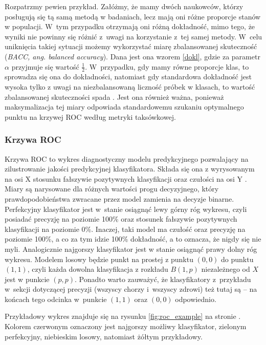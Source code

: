 \documentclass[inzynierska]{pwr_wmat_praca_dyplomowa}
\theoremstyle{plain}
\numberwithin{theorem}{chapter}
\theoremstyle{definition}
\numberwithin{theorem}{chapter}
\begin{document}
Rozpatrzmy pewien przykład. Załóżmy, że mamy dwóch naukowców, którzy posługują się tą samą metodą w badaniach, lecz mają oni różne proporcje stanów w populacji. W~tym przypadku otrzymają oni różną dokładność, mimo tego, że wyniki nie powinny się różnić z~uwagi na korzystanie z~tej samej metody. W~celu uniknięcia takiej sytuacji możemy wykorzystać miarę zbalansowanej skuteczność (\textit{BACC, ang. balanced accuracy}). Dana jest ona wzorem \ref{dokl}, gdzie za parametr $\alpha$ przyjmuje się wartość $\frac{1}{2}$. W~przypadku, gdy mamy równe proporcje klas, to sprowadza się ona do dokładności, natomiast gdy standardowa dokładność jest wysoka tylko z uwagi na niezbalansowaną liczność próbek w klasach, to wartość zbalansowanej skuteczności spada \cite{balanced_accuracy}. Jest ona również ważna, ponieważ maksymalizacja tej miary odpowiada standardowemu szukaniu optymalnego punktu na krzywej ROC według metryki taksówkowej.

\subsubsection{Krzywa ROC}

Krzywa ROC to wykres diagnostyczny modelu predykcyjnego pozwalający na zilustrowanie jakości predykcyjnej klasyfikatora. Składa się ona z wyrysowanym na osi X stosunku fałszywie pozytywnych klasyfikacji oraz czułości na osi Y \cite{evaluation_metrics}. Miary są narysowane dla różnych wartości progu decyzyjnego, który prawdopodobieństwa zwracane przez model zamienia na decyzje binarne. Perfekcyjny klasyfikator jest w~stanie osiągnąć lewy górny róg wykresu, czyli posiadać precyzję na poziomie 100\% oraz stosunek fałszywie pozytywnych klasyfikacji na poziomie 0\%. Inaczej, taki model ma czułość oraz precyzję na poziomie 100\%, a co za tym idzie 100\% dokładność, a to oznacza, że nigdy się nie myli.  Analogicznie najgorszy klasyfikator jest w stanie osiągnąć prawy dolny róg wykresu. Modelem losowy będzie punkt na prostej z punktu $(0,0)$ do punktu $(1,1)$, czyli każda dowolna klasyfikacja z rozkładu $B(1, p)$ niezależnego od $X$ jest w punkcie $(p, p)$. Ponadto warto zauważyć, że klasyfikatory z~przykładu w~sekcji dotyczącej precyzji (wszyscy chorzy i~wszyscy zdrowi) też tutaj są -- na końcach tego odcinka w~punkcie $(1, 1)$ oraz $(0, 0)$ odpowiednio.

Przykładowy wykres znajduje się na rysunku \ref{fig:roc_example} na stronie \pageref{fig:roc_example}. Kolorem czerwonym oznaczony jest najgorszy możliwy klasyfikator, zielonym perfekcyjny, niebieskim losowy, natomiast żółtym przykładowy.
\end{document}

